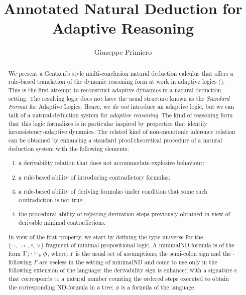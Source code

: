 \documentclass[]{article}
\title{Annotated Natural Deduction for Adaptive Reasoning}
\author{Giuseppe Primiero}
\date{}
\begin{document}
\maketitle

\begin{abstract}

We present a Gentzen's style multi-conclusion natural deduction calculus that offers a rule-based translation of the dynamic reasoning form at work in adaptive logics (\cite{batens07}). This is the first attempt to reconstruct adaptive dynamics in a natural deduction setting. The resulting logic does not have the usual structure known as the \textit{Standard Format} for Adaptive Logics. Hence, we \textit{do not} introduce an adaptive logic, but we can talk of a natural-deduction system for \textit{adaptive reasoning}. The kind of reasoning form that this logic formalizes is in particular inspired by properties that identify inconsistency-adaptive dynamics. The related kind of non-monotonic inference relation can be obtained by enhancing a standard proof-theoretical procedure of a natural deduction system with the following elements:

\begin{enumerate}
\item a derivability relation that does not accommodate explosive behaviour;

\item a rule-based ability of introducing contradictory formulas;

\item a rule-based ability of deriving formulas under condition that some such contradiction is not true;

\item the procedural ability of rejecting derivation steps previously obtained in view of derivable minimal contradictions.
\end{enumerate}
%
In view of the first property, we start by defining the type universe for the $\{\neg, \rightarrow, \wedge,\vee\}$ fragment of minimal propositional logic. A {\sf minimalND}-formula is of the form $\Gamma;\cdot \vdash_{\sf s} \phi$, where: $\Gamma$ is the usual set of assumptions; the semi-colon sign and the $\cdot$ following $\Gamma$ are useless in the setting of {\sf minimalND} and come to use only in the following extension of the language; the derivability sign is enhanced with a signature {\sf s} that corresponds to a natural number counting the ordered steps executed to obtain the corresponding ND-formula in a tree; $\phi$ is a formula of the language. 


\end{abstract}
\end{document}
